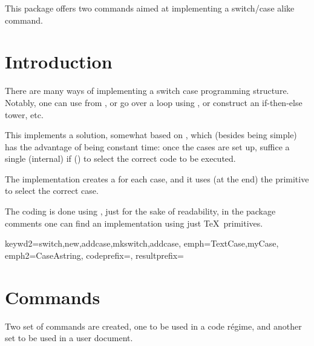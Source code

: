 \documentclass[10pt]{article}
\begin{document}
  

\begin{typesetabstract}
 
This package offers two commands aimed at implementing a switch/case alike command.
\end{typesetabstract}

\tableofcontents

\section{Introduction}
There are many ways of implementing a switch case programming structure. Notably, one can use  from , or go over a loop using \tsobj{\pdfstrcmp}, or construct an if-then-else tower, etc.

This implements a solution, somewhat based on  \cite{stackexchage:switchcase}, which (besides being simple) has the advantage of being constant time: once the cases are set up, suffice a single (internal) if (\tsobj{\ifcsname}) to select the correct code to be executed. 



\begin{tsremark}
  The implementation creates a \tsobj{\csname} for each case, and it uses (at the end) the primitive \tsobj{\ifcsname} to select the correct case.
\end{tsremark}
\begin{tsremark}
  The coding is done using , just for the sake of readability, in the package comments one can find an implementation using just \TeX\  primitives.
\end{tsremark}

  {
    keywd2={switch,new,addcase,mkswitch,addcase},
    emph={TextCase,myCase},
    emph2={CaseAstring},
    codeprefix={},
    resultprefix={}
  }


\section{Commands}
Two set of commands are created, one to be used in a  code régime, and another set to be used in a user document.
\end{document}

